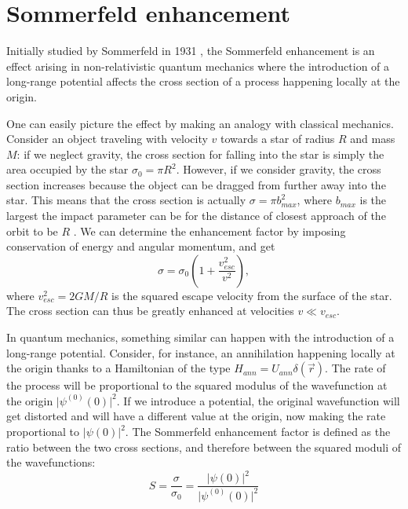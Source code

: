 \section{Sommerfeld enhancement}

Initially studied by Sommerfeld in 1931 \cite{Sommerfeld_1931}, the Sommerfeld enhancement is an effect arising in non-relativistic quantum mechanics where the introduction of a long-range potential affects the cross section of a process happening locally at the origin.

One can easily picture the effect by making an analogy with classical mechanics. Consider an object traveling with velocity \(v\) towards a star of radius \(R\) and mass \(M\): if we neglect gravity, the cross section for falling into the star is simply the area occupied by the star \(\sigma _0=\pi R^2\). However, if we consider gravity, the cross section increases because the object can be dragged from further away into the star. This means that the cross section is actually \(\sigma = \pi b_{max}^2 \), where \(b_{max}\) is the largest the impact parameter can be for the distance of closest approach of the orbit to be \(R\) \cite{Arkani_2009, Cirelli_2024}. We can determine the enhancement factor by imposing conservation of energy and angular momentum, and get
\begin{equation}
	\sigma = \sigma _0 \left( 1+ \frac{v_{esc} ^2}{v ^2} \right), 
\end{equation}
where \(v_{esc} ^2 = 2GM / R\) is the squared escape velocity from the surface of the star. The cross section can thus be greatly enhanced at velocities \(v \ll v_{esc} \).

In quantum mechanics, something similar can happen with the introduction of a long-range potential. Consider, for instance, an annihilation happening locally at the origin thanks to a Hamiltonian of the type \(H_{ann} = U_{ann} \delta (\vec{r})\). The rate of the process will be proportional to the squared modulus of the wavefunction at the origin \(\vert \psi ^{(0)}(0) \vert^2 \). If we introduce a potential, the original wavefunction will get distorted and will have a different value at the origin, now making the rate proportional to \(\vert \psi (0) \vert^2 \). The Sommerfeld enhancement factor is defined as the ratio between the two cross sections, and therefore between the squared moduli of the wavefunctions:
\begin{equation}\label{eq:sommerfeld_def}
	S = \frac{\sigma }{\sigma _0} = \frac{\vert \psi (0) \vert ^2}{\vert \psi ^{(0)}(0) \vert ^2}
\end{equation}

